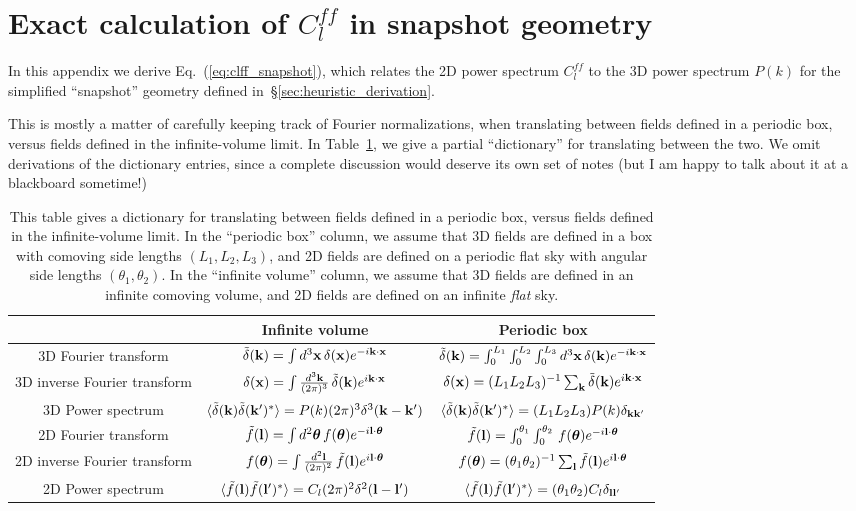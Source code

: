 \documentclass[aps,prd,superscriptaddress,groupedaddress,nofootinbib,nobibnotes]{revtex4}
\def\k{{\bf k}}
\def\x{{\bf x}}
\def\l{{\bf l}}
\def\th{{\bm{\theta}}}
\def\tdelta{\tilde\delta}
\def\tf{\tilde f}
\begin{document}
\section{Exact calculation of $C_l^{ff}$ in snapshot geometry}
\label{app:clff_snapshot}

In this appendix we derive Eq.~(\ref{eq:clff_snapshot}), which relates the 2D power spectrum $C_l^{ff}$
to the 3D power spectrum $P(k)$ for the simplified ``snapshot'' geometry defined in~\S\ref{sec:heuristic_derivation}.

This is mostly a matter of carefully keeping track of Fourier normalizations,
when translating between fields defined in a periodic box, versus fields defined
in the infinite-volume limit.  In Table~\ref{tab:finite_volume}, we give a
partial ``dictionary'' for translating between the two.  We omit derivations
of the dictionary entries, since a complete discussion would deserve its own
set of notes (but I am happy to talk about it at a blackboard sometime!)

\begin{table}[h!]
\begin{tabular}{|c|c|c|}
\hline
     & Infinite volume  &  Periodic box  \\ \hline
  3D Fourier transform  
      &  $\tdelta(\k) = \int d^3\x \, \delta(\x) e^{-i\k\cdot\x}$
      &  $\tdelta(\k) = \int_0^{L_1} \int_0^{L_2} \int_0^{L_3} d^3\x \, \delta(\k) e^{-i\k\cdot\x}$ \\
  3D inverse Fourier transform  
      &  $\delta(\x) = \int \frac{d^3\k}{(2\pi)^3} \, \tdelta(\k) e^{i\k\cdot\x}$
      &  $\delta(\x) = (L_1L_2L_3)^{-1} \sum_{\k} \tdelta(\k) e^{i\k\cdot\x}$ \\
  3D Power spectrum
      & $\langle \tdelta(\k) \tdelta(\k')^* \rangle = P(k) (2\pi)^3 \delta^3(\k-\k') $
      & $\langle \tdelta(\k) \tdelta(\k')^* \rangle = (L_1L_2L_3) P(k) \delta_{\k\k'}$ \\
  2D Fourier transform  
      &  $\tf(\l) = \int d^2\th \, f(\th) e^{-i\l\cdot\th}$
      &  $\tf(\l) = \int_0^{\theta_1} \int_0^{\theta_2} \, f(\th) e^{-i\l\cdot\th}$ \\
  2D inverse Fourier transform  
      &  $f(\th) = \int \frac{d^2\l}{(2\pi)^2} \, \tf(\l) e^{i\l\cdot\th}$
      &  $f(\th) = (\theta_1\theta_2)^{-1} \sum_{\l} \tf(\l) e^{i\l\cdot\th}$ \\
  2D Power spectrum
      & $\langle \tf(\l) \tf(\l')^* \rangle = C_l (2\pi)^2 \delta^2(\l-\l') $
      & $\langle \tf(\l) \tf(\l')^* \rangle = (\theta_1\theta_2) C_l \delta_{\l\l'}$ \\
\hline
\end{tabular}
\caption{This table gives a dictionary for translating between fields defined in a
  periodic box, versus fields defined in the infinite-volume limit.
  In the ``periodic box'' column, we assume that 3D fields are defined in a box with 
  comoving side lengths $(L_1,L_2,L_3)$, and 2D fields are defined on a periodic flat sky
  with angular side lengths $(\theta_1,\theta_2)$.
  In the ``infinite volume'' column, we assume that 3D fields are defined in an infinite
  comoving volume, and 2D fields are defined on an infinite {\em flat} sky.}
\label{tab:finite_volume}
\end{table}
\end{document}
